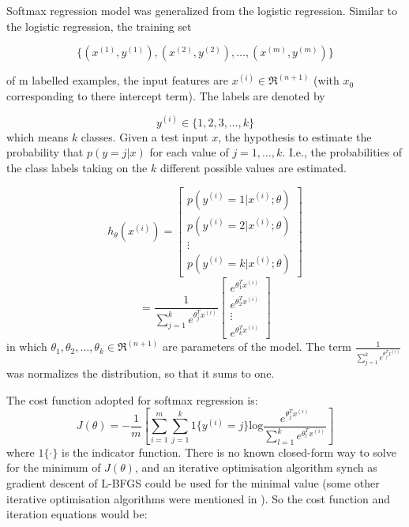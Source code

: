 \documentclass[graybox]{svmult}
\begin{document}
Softmax regression model was generalized  from the logistic regression. Similar to the logistic regression, the training set

\begin{equation}
\{(x^{(1)},y^{(1)}), (x^{(2)},y^{(2)}), \ldots, (x^{(m)},y^{(m)}) \}
\end{equation}

\noindent of m labelled examples, the input features are $x^{(i)} \in \Re^{(n+1)}$ (with $x_0$ corresponding to there intercept term). The labels are denoted by 

\begin{equation}
y^{(i)} \in \{1,2,3,\ldots,k\}
\end{equation}
\noindent which means $k$ classes.
Given a test input $x$, the hypothesis to estimate the probability that $p(y=j|x)$ for each value of $j=1,\ldots,k$. I.e., the probabilities of the class labels taking on the $k$ different possible values are estimated. 

\begin{equation}
h_{\theta}(x^{(i)}) = 
\left[
      \begin{array}{cccccc}
        p(y^{(i)}=1|x^{(i)};\theta) \\
        p(y^{(i)}=2|x^{(i)};\theta) \\
        \vdots \\
        p(y^{(i)}=k|x^{(i)};\theta)
      \end{array}
    \right]
\end{equation}
\begin{equation}
= \frac{1}{\sum_{j=1}^ke^{\theta_j^Tx^{(i)}}}
\left[
      \begin{array}{cccccc}
        e^{\theta_1^Tx^{(i)}}\\
        e^{\theta_2^Tx^{(i)}}\\
        \vdots \\
        e^{\theta_k^Tx^{(i)}}
      \end{array}
    \right]
\end{equation}
\noindent in which $\theta_1,\theta_2,\ldots,\theta_k \in \Re^{(n+1)}$ are parameters of the model. The term $\frac{1}{\sum_{j=1}^ke^{\theta_j^Tx^{(i)}}}$ was normalizes the distribution, so that it sums to one.

The cost function adopted for softmax regression is:
\begin{equation}
J(\theta) = -\frac{1}{m}[\sum_{i=1}^m\sum_{j=1}^k1\{y^{(i)}=j\}\text{log}{\frac{e^{\theta_j^Tx^{(i)}}}{\sum_{l=1}^ke^{\theta_l^Tx^{(i)}}}}]
\end{equation}
where $1\{\cdot\}$ is the indicator function.
There is no known closed-form way to solve for the minimum of $J(\theta)$, and an iterative optimisation algorithm synch as gradient descent of L-BFGS could be used for the minimal value (some other iterative optimisation algorithms were mentioned in \cite{ngiam2011optimization}).
So the cost function and iteration equations would be:
\end{document}
